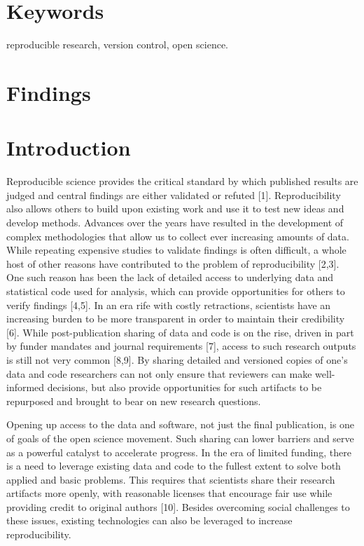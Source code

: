 \documentclass[]{article}
\begin{document}
\section{Keywords}

reproducible research, version control, open science.

\newpage

\section{Findings}

\section{Introduction}

Reproducible science provides the critical standard by which published
results are judged and central findings are either validated or refuted
{[}1{]}. Reproducibility also allows others to build upon existing work
and use it to test new ideas and develop methods. Advances over the
years have resulted in the development of complex methodologies that
allow us to collect ever increasing amounts of data. While repeating
expensive studies to validate findings is often difficult, a whole host
of other reasons have contributed to the problem of reproducibility
{[}2,3{]}. One such reason has been the lack of detailed access to
underlying data and statistical code used for analysis, which can
provide opportunities for others to verify findings {[}4,5{]}. In an era
rife with costly retractions, scientists have an increasing burden to be
more transparent in order to maintain their credibility {[}6{]}. While
post-publication sharing of data and code is on the rise, driven in part
by funder mandates and journal requirements {[}7{]}, access to such
research outputs is still not very common {[}8,9{]}. By sharing detailed
and versioned copies of one's data and code researchers can not only
ensure that reviewers can make well-informed decisions, but also provide
opportunities for such artifacts to be repurposed and brought to bear on
new research questions.

Opening up access to the data and software, not just the final
publication, is one of goals of the open science movement. Such sharing
can lower barriers and serve as a powerful catalyst to accelerate
progress. In the era of limited funding, there is a need to leverage
existing data and code to the fullest extent to solve both applied and
basic problems. This requires that scientists share their research
artifacts more openly, with reasonable licenses that encourage fair use
while providing credit to original authors {[}10{]}. Besides overcoming
social challenges to these issues, existing technologies can also be
leveraged to increase reproducibility.
\end{document}
